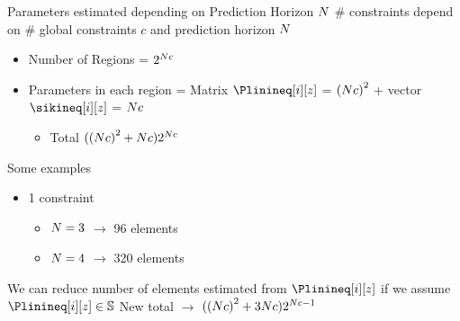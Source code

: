 \documentclass[handout,aspectratio=169]{beamer}
\begin{document}
\begin{frame}{Parameters estimated depending on Prediction Horizon $N$}
  \# constraints depend on \# global constraints $c$ and prediction horizon $N$

  \begin{itemize}
    \item Number of Regions = $2^{N c}$
    \item Parameters in each region = Matrix $\Plinineq[i][z]$ = ${(N c)}^{2}$ + vector $\sikineq[i][z]$ = $N c$
          \begin{itemize}
                  \item Total $({(N c)}^{2}+N c)2^{N c}$
          \end{itemize}
  \end{itemize}

  Some examples
  \begin{itemize}
    \item 1 constraint
          \begin{itemize}
            \item $N = 3$ $\to$ 96 elements
            \item $N = 4$ $\to$ 320 elements
          \end{itemize}
  \end{itemize}

  \begin{remark}
    We can reduce number of elements estimated from $\Plinineq[i][z]$ if we assume $\Plinineq[i][z]\in\symmetric$
    New total $\to$ $({(N c)}^{2}+3N c)2^{N c-1}$
  \end{remark}
\end{frame}
\end{document}
